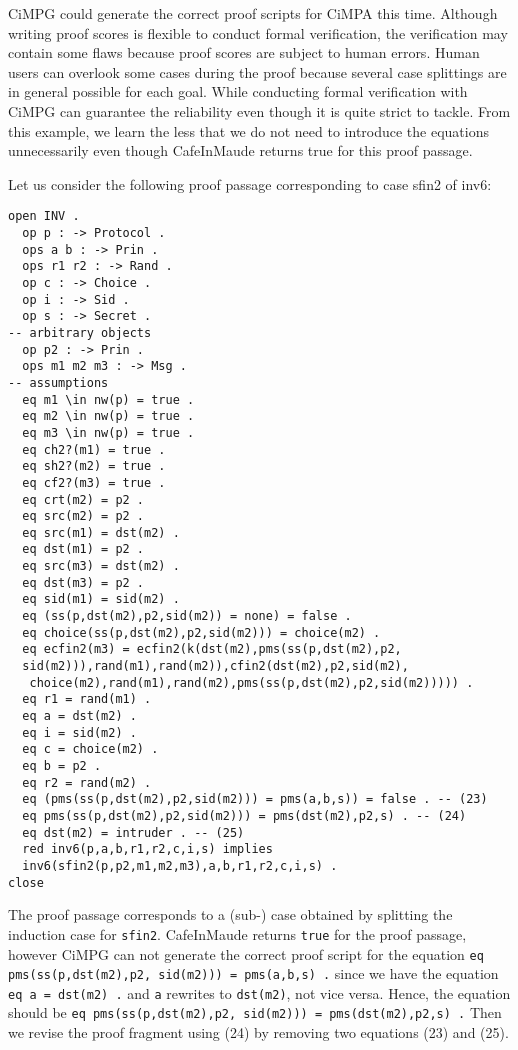 \documentclass[a4paper,fleqn]{cas-dc}
\begin{document}
CiMPG could generate the correct proof scripts for CiMPA this time. Although writing proof scores is flexible to conduct formal verification, the verification may contain some flaws because proof scores are subject to human errors. Human users can overlook some cases during the proof because several case splittings are in general possible for each goal. While conducting formal verification with CiMPG can guarantee the reliability even though it is quite strict to tackle. From this example, we learn the less that we do not need to introduce the equations unnecessarily even though CafeInMaude returns true for this proof passage. 

Let us consider the following proof passage corresponding to case sfin2 of inv6:
\begin{small}
\begin{verbatim}
open INV .
  op p : -> Protocol .
  ops a b : -> Prin .
  ops r1 r2 : -> Rand .
  op c : -> Choice .
  op i : -> Sid .
  op s : -> Secret .
-- arbitrary objects
  op p2 : -> Prin .
  ops m1 m2 m3 : -> Msg .
-- assumptions
  eq m1 \in nw(p) = true .
  eq m2 \in nw(p) = true .
  eq m3 \in nw(p) = true .
  eq ch2?(m1) = true .
  eq sh2?(m2) = true .
  eq cf2?(m3) = true .
  eq crt(m2) = p2 .
  eq src(m2) = p2 .
  eq src(m1) = dst(m2) .
  eq dst(m1) = p2 .
  eq src(m3) = dst(m2) .
  eq dst(m3) = p2 .
  eq sid(m1) = sid(m2) .
  eq (ss(p,dst(m2),p2,sid(m2)) = none) = false .
  eq choice(ss(p,dst(m2),p2,sid(m2))) = choice(m2) .
  eq ecfin2(m3) = ecfin2(k(dst(m2),pms(ss(p,dst(m2),p2,
  sid(m2))),rand(m1),rand(m2)),cfin2(dst(m2),p2,sid(m2),
   choice(m2),rand(m1),rand(m2),pms(ss(p,dst(m2),p2,sid(m2))))) .
  eq r1 = rand(m1) .
  eq a = dst(m2) .
  eq i = sid(m2) .
  eq c = choice(m2) .
  eq b = p2 .
  eq r2 = rand(m2) .
  eq (pms(ss(p,dst(m2),p2,sid(m2))) = pms(a,b,s)) = false . -- (23)
  eq pms(ss(p,dst(m2),p2,sid(m2))) = pms(dst(m2),p2,s) . -- (24)
  eq dst(m2) = intruder . -- (25)
  red inv6(p,a,b,r1,r2,c,i,s) implies
  inv6(sfin2(p,p2,m1,m2,m3),a,b,r1,r2,c,i,s) .
close
\end{verbatim}
\end{small}
The proof passage corresponds to a (sub-) case obtained by splitting the induction case for \verb!sfin2!. CafeInMaude returns \verb!true! for the proof passage, however CiMPG can not generate the correct proof script for the equation 
\verb!eq pms(ss(p,dst(m2),p2, sid(m2))) = pms(a,b,s) .!
since we have the equation \verb!eq a = dst(m2) .! and \verb!a! rewrites to \verb!dst(m2)!, not vice versa. Hence, the equation should be \verb!eq pms(ss(p,dst(m2),p2, sid(m2))) = pms(dst(m2),p2,s) .! Then we revise the proof fragment using (24) by removing two equations (23) and (25).
\end{document}
